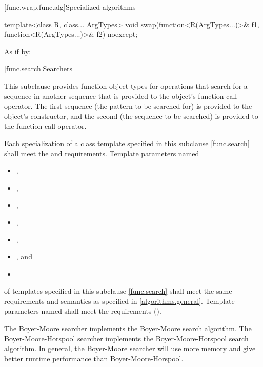 [func.wrap.func.alg]{Specialized algorithms}

%
\begin{itemdecl}
template<class R, class... ArgTypes>
  void swap(function<R(ArgTypes...)>& f1, function<R(ArgTypes...)>& f2) noexcept;
\end{itemdecl}

\begin{itemdescr}
\pnum
\effects
As if by: 
\end{itemdescr}%

[func.search]{Searchers}

\pnum
This subclause provides function object types for
operations that search for a sequence  in another
sequence  that is provided to the object's function call
operator.  The first sequence (the pattern to be searched for) is provided to
the object's constructor, and the second (the sequence to be searched) is
provided to the function call operator.

\pnum
Each specialization of a class template specified in this subclause \ref{func.search}
shall meet the  and  requirements.
Template parameters named
\begin{itemize}
\item {},
\item {},
\item {},
\item {},
\item {},
\item {}, and
\item {}
\end{itemize}
of templates specified in this subclause
\ref{func.search} shall meet the same requirements and semantics as
specified in \ref{algorithms.general}.
Template parameters named  shall meet the 
requirements ().

\pnum
The Boyer-Moore searcher implements the Boyer-Moore search algorithm.
The Boyer-Moore-Horspool searcher implements the Boyer-Moore-Horspool search algorithm.
In general, the Boyer-Moore searcher will use more memory and give better runtime performance than Boyer-Moore-Horspool.


